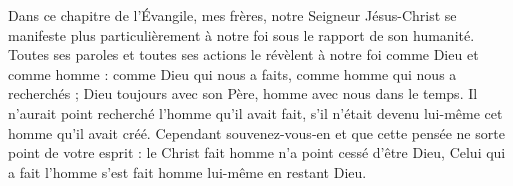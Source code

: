  Dans ce chapitre de l’Évangile, mes frères, notre Seigneur Jésus-Christ se manifeste plus particulièrement à notre foi sous le rapport de son humanité. Toutes ses paroles et toutes ses actions le révèlent à notre foi comme Dieu et comme homme : comme Dieu qui nous a faits, comme homme qui nous a recherchés ; Dieu toujours avec son Père, homme avec nous dans le temps. Il n’aurait point recherché l’homme qu’il avait fait, s’il n’était devenu lui-même cet homme qu’il avait créé. Cependant souvenez-vous-en et que cette pensée ne sorte point de votre esprit : le Christ fait homme n’a point cessé d’être Dieu, Celui qui a fait l’homme s’est fait homme lui-même en restant Dieu.